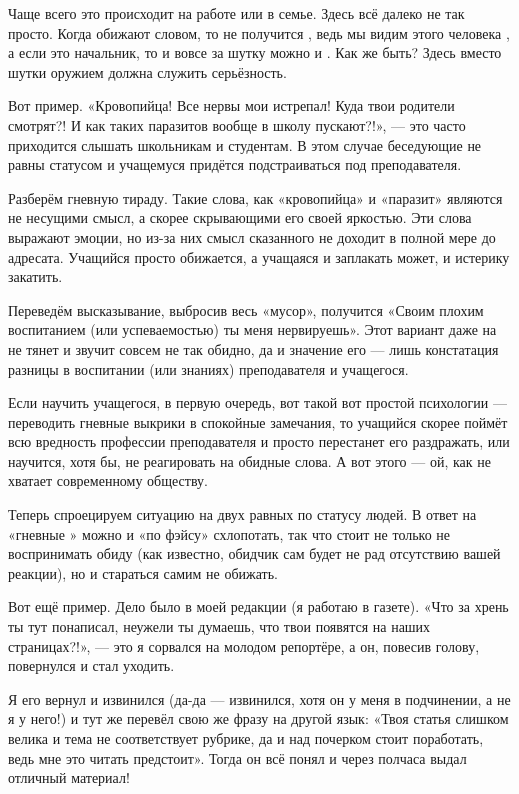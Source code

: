 Чаще всего это происходит на работе или в семье. Здесь всё далеко не так просто. Когда обижают словом, то не получится , ведь мы видим этого человека , а если это начальник, то и вовсе за шутку можно и . Как же быть? Здесь вместо шутки оружием должна служить серьёзность.

Вот пример. «Кровопийца! Все нервы мои истрепал! Куда твои родители смотрят?! И как таких паразитов вообще в школу пускают?!», --- это часто приходится слышать школьникам и студентам. В этом случае беседующие не равны статусом и учащемуся придётся подстраиваться под преподавателя.

Разберём гневную тираду. Такие слова, как «кровопийца» и «паразит» являются не несущими смысл, а скорее скрывающими его своей яркостью. Эти слова выражают эмоции, но из-за них смысл сказанного не доходит в полной мере до адресата. Учащийся просто обижается, а учащаяся и заплакать может, и истерику закатить.

Переведём высказывание, выбросив весь «мусор», получится «Своим плохим воспитанием (или успеваемостью) ты меня нервируешь». Этот вариант даже на  не тянет и звучит совсем не так обидно, да и значение его --- лишь констатация разницы в воспитании (или знаниях) преподавателя и учащегося.

Если научить учащегося, в первую очередь, вот такой вот простой психологии --- переводить гневные выкрики в спокойные замечания, то учащийся скорее поймёт всю вредность профессии преподавателя и просто перестанет его раздражать, или научится, хотя бы, не реагировать на обидные слова. А вот этого --- ой, как не хватает современному обществу.

Теперь спроецируем ситуацию на двух равных по статусу людей. В ответ на «гневные » можно и «по фэйсу» схлопотать, так что стоит не только не воспринимать обиду (как известно, обидчик сам будет не рад отсутствию вашей реакции), но и стараться самим не обижать.

Вот ещё пример. Дело было в моей редакции (я работаю в газете). «Что за хрень ты тут понаписал, неужели ты думаешь, что твои  появятся на наших страницах?!», --- это я сорвался на молодом репортёре, а он, повесив голову, повернулся и стал уходить.

Я его вернул и извинился (да-да --- извинился, хотя он у меня в подчинении, а не я у него!) и тут же перевёл свою же фразу на другой язык: «Твоя статья слишком велика и тема не соответствует рубрике, да и над почерком стоит поработать, ведь мне это читать предстоит». Тогда он всё понял и через полчаса выдал отличный материал!

